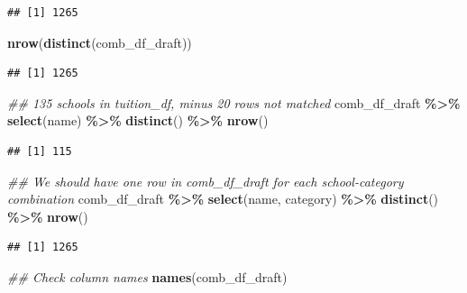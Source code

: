 \documentclass[
]{article}
\newenvironment{Shaded}{\begin{snugshade}}{\end{snugshade}}
\newcommand{\CommentTok}[1]{\textcolor[rgb]{0.56,0.35,0.01}{\textit{#1}}}
\newcommand{\KeywordTok}[1]{\textcolor[rgb]{0.13,0.29,0.53}{\textbf{#1}}}
\newcommand{\NormalTok}[1]{#1}
\newcommand{\OperatorTok}[1]{\textcolor[rgb]{0.81,0.36,0.00}{\textbf{#1}}}
\newcommand{\StringTok}[1]{\textcolor[rgb]{0.31,0.60,0.02}{#1}}
\begin{document}
\begin{verbatim}
## [1] 1265
\end{verbatim}

\begin{Shaded}
\begin{Highlighting}[]
\KeywordTok{nrow}\NormalTok{(}\KeywordTok{distinct}\NormalTok{(comb\_df\_draft))}
\end{Highlighting}
\end{Shaded}

\begin{verbatim}
## [1] 1265
\end{verbatim}

\begin{Shaded}
\begin{Highlighting}[]
\CommentTok{\#\# 135 schools in tuition\_df, minus 20 rows not matched}
\NormalTok{comb\_df\_draft }\OperatorTok{\%\textgreater{}\%}\StringTok{ }
\StringTok{    }\KeywordTok{select}\NormalTok{(name) }\OperatorTok{\%\textgreater{}\%}\StringTok{ }
\StringTok{    }\KeywordTok{distinct}\NormalTok{() }\OperatorTok{\%\textgreater{}\%}\StringTok{ }
\StringTok{    }\KeywordTok{nrow}\NormalTok{()}
\end{Highlighting}
\end{Shaded}

\begin{verbatim}
## [1] 115
\end{verbatim}

\begin{Shaded}
\begin{Highlighting}[]
\CommentTok{\#\# We should have one row in comb\_df\_draft for each school{-}category combination}
\NormalTok{comb\_df\_draft }\OperatorTok{\%\textgreater{}\%}\StringTok{ }
\StringTok{    }\KeywordTok{select}\NormalTok{(name, category) }\OperatorTok{\%\textgreater{}\%}\StringTok{ }
\StringTok{    }\KeywordTok{distinct}\NormalTok{() }\OperatorTok{\%\textgreater{}\%}\StringTok{ }
\StringTok{    }\KeywordTok{nrow}\NormalTok{()}
\end{Highlighting}
\end{Shaded}

\begin{verbatim}
## [1] 1265
\end{verbatim}

\begin{Shaded}
\begin{Highlighting}[]
\CommentTok{\#\# Check column names}
\KeywordTok{names}\NormalTok{(comb\_df\_draft)}
\end{Highlighting}
\end{Shaded}
\end{document}
